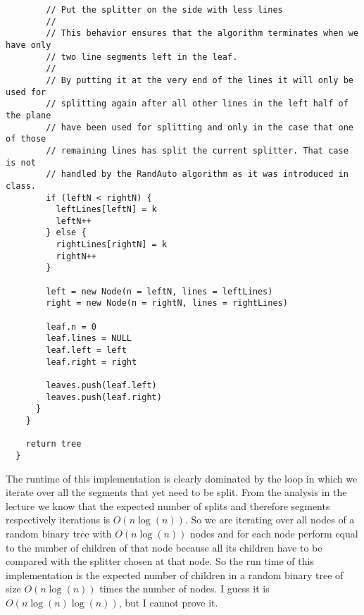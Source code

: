 \documentclass[10pt,a4paper]{article}
\begin{document}
\begin{verbatim}
        // Put the splitter on the side with less lines
        //
        // This behavior ensures that the algorithm terminates when we have only
        // two line segments left in the leaf.
        //
        // By putting it at the very end of the lines it will only be used for
        // splitting again after all other lines in the left half of the plane
        // have been used for splitting and only in the case that one of those
        // remaining lines has split the current splitter. That case is not
        // handled by the RandAuto algorithm as it was introduced in class.
        if (leftN < rightN) {
          leftLines[leftN] = k
          leftN++
        } else {
          rightLines[rightN] = k
          rightN++
        }

        left = new Node(n = leftN, lines = leftLines)
        right = new Node(n = rightN, lines = rightLines)

        leaf.n = 0
        leaf.lines = NULL
        leaf.left = left
        leaf.right = right

        leaves.push(leaf.left)
        leaves.push(leaf.right)
      }
    }

    return tree
  }
\end{verbatim}

The runtime of this implementation is clearly dominated by the loop in which we iterate over all the segments that yet need to be split.
From the analysis in the lecture we know that the expected number of splits and therefore segments respectively iterations is $O(n \log(n))$.
So we are iterating over all nodes of a random binary tree with $O(n \log(n))$ nodes and for each node perform equal to the number of children of that node because all its children have to be compared with the splitter chosen at that node.
So the run time of this implementation is the expected number of children in a random binary tree of size $O(n \log(n))$ times the number of nodes.
I guess it is $O(n \log(n) \log(n))$, but I cannot prove it.
\end{document}
